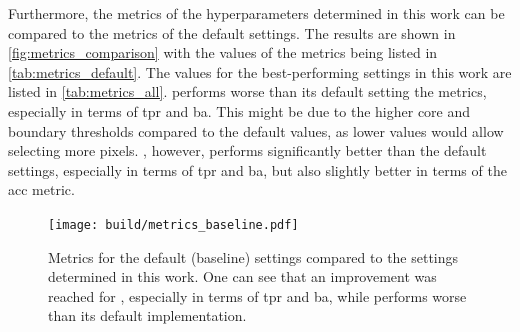 Furthermore, the metrics of the hyperparameters determined in this work can be compared to the
metrics of the default settings. The results are shown in \autoref{fig:metrics_comparison} with the
values of the metrics being listed in \autoref{tab:metrics_default}. The values for the best-performing
settings in this work are listed in \autoref{tab:metrics_all}.
\fact{} performs worse than its default setting \wrt the metrics, especially in terms of
\gls{tpr} and \gls{ba}. This might be due to the higher core and boundary thresholds compared to the
default values, as lower values would allow selecting more pixels. \tcc{}, however, performs
significantly better than the default settings, especially in terms of \gls{tpr} and \gls{ba}, but
also slightly better in terms of the \gls{acc} metric.
\begin{figure}
    \centering
    \texttt{[image: build/metrics\_baseline.pdf]}
    \caption{Metrics for the default (baseline) settings compared to the settings determined in this work.
    One can see that an improvement was reached for \tcc, especially in terms of \gls{tpr} and \gls{ba}, while
    \fact{} performs worse than its default implementation.}
    \label{fig:metrics_comparison}
\end{figure}
